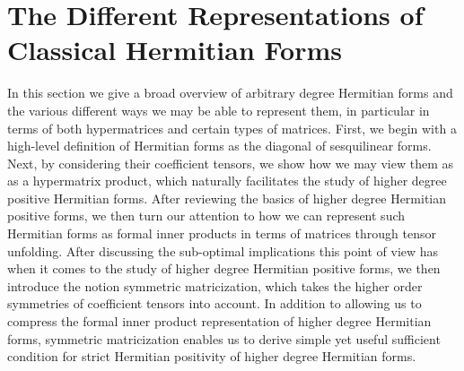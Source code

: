 \documentclass[11pt]{article}
\begin{document}
\section{The Different Representations of Classical Hermitian Forms}\label{The Different Representations of Classical Hermitian Forms}
In this section we give a broad overview of arbitrary degree Hermitian forms and the various different ways we may be able to represent them, in particular in terms of both hypermatrices and certain types of matrices. First, we begin with a high-level definition of Hermitian forms as the diagonal of sesquilinear forms. Next, by considering their coefficient tensors, we show how we may view them as as a hypermatrix product, which naturally facilitates the study of higher degree positive Hermitian forms. After reviewing the basics of higher degree Hermitian positive forms, we then turn our attention to how we can represent such Hermitian forms as formal inner products in terms of matrices through tensor unfolding. After discussing the sub-optimal implications this point of view has when it comes to the study of higher degree Hermitian positive forms, we then introduce the notion symmetric matricization, which takes the higher order symmetries of coefficient tensors into account. In addition to allowing us to compress the formal inner product representation of higher degree Hermitian forms, symmetric matricization enables us to derive simple yet useful sufficient condition for strict Hermitian positivity of higher degree Hermitian forms. 
\end{document}
